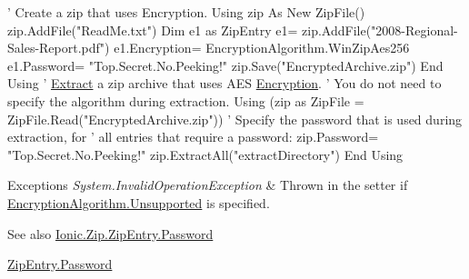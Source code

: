 \begin{DoxyCode}
\textcolor{stringliteral}{' Create a zip that uses Encryption.}
\textcolor{stringliteral}{Using zip As New ZipFile()}
\textcolor{stringliteral}{    zip.AddFile("ReadMe.txt")}
\textcolor{stringliteral}{    Dim e1 as ZipEntry}
\textcolor{stringliteral}{    e1= zip.AddFile("2008-Regional-Sales-Report.pdf")}
\textcolor{stringliteral}{    e1.Encryption= EncryptionAlgorithm.WinZipAes256}
\textcolor{stringliteral}{    e1.Password= "Top.Secret.No.Peeking!"}
\textcolor{stringliteral}{    zip.Save("EncryptedArchive.zip")}
\textcolor{stringliteral}{End Using}
\textcolor{stringliteral}{}
\textcolor{stringliteral}{'} \mbox{\hyperlink{class_super_tiled2_unity_1_1_ionic_1_1_zip_1_1_zip_entry_a9d65543aadd23e47e188175412891b42}{Extract}} a zip archive that uses AES \mbox{\hyperlink{class_super_tiled2_unity_1_1_ionic_1_1_zip_1_1_zip_entry_ab8de4882ffe896d2657b27264807ef1c}{Encryption}}.
\textcolor{stringliteral}{' You do not need to specify the algorithm during extraction.}
\textcolor{stringliteral}{Using (zip as ZipFile = ZipFile.Read("EncryptedArchive.zip"))}
\textcolor{stringliteral}{    '} Specify the password that is used during extraction, \textcolor{keywordflow}{for}
    \textcolor{stringliteral}{' all entries that require a password:}
\textcolor{stringliteral}{    zip.Password= "Top.Secret.No.Peeking!"}
\textcolor{stringliteral}{    zip.ExtractAll("extractDirectory")}
\textcolor{stringliteral}{End Using}
\end{DoxyCode}



\begin{DoxyExceptions}{Exceptions}
{\em System.\+Invalid\+Operation\+Exception} & Thrown in the setter if \mbox{\hyperlink{namespace_super_tiled2_unity_1_1_ionic_1_1_zip_aa3f4e8aa12ef827ac72177a49b4e28e6ab4080bdf74febf04d578ff105cce9d3f}{Encryption\+Algorithm.\+Unsupported}} is specified. \\
\hline
\end{DoxyExceptions}


\begin{DoxySeeAlso}{See also}
\mbox{\hyperlink{class_super_tiled2_unity_1_1_ionic_1_1_zip_1_1_zip_entry_a4e1ce23f98c2e3a60a2d47a25a243a82}{Ionic.\+Zip.\+Zip\+Entry.\+Password}}


\end{DoxySeeAlso}
\mbox{\hyperlink{class_super_tiled2_unity_1_1_ionic_1_1_zip_1_1_zip_entry_a4e1ce23f98c2e3a60a2d47a25a243a82}{Zip\+Entry.\+Password}}

